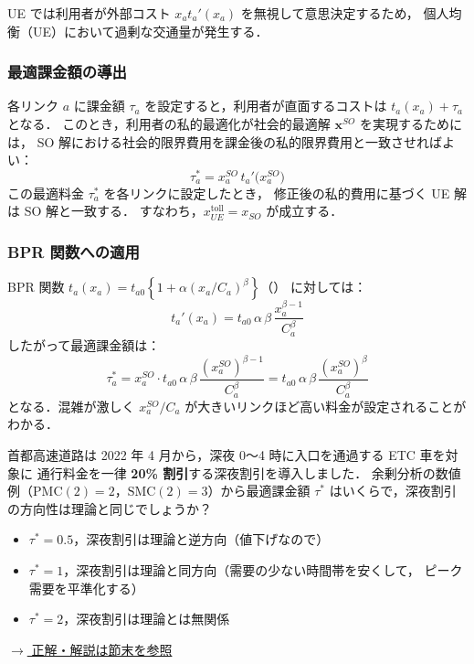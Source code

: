 UE では利用者が外部コスト $x_a t_a'(x_a)$ を無視して意思決定するため，
個人均衡（UE）において過剰な交通量が発生する．

\subsubsection*{最適課金額の導出}

各リンク $a$ に課金額 $\tau_a$ を設定すると，利用者が直面するコストは
$t_a(x_a) + \tau_a$ となる．
このとき，利用者の私的最適化が社会的最適解 $\boldsymbol{x}^{SO}$ を実現するためには，
SO 解における社会的限界費用を課金後の私的限界費用と一致させればよい\cite{Beckmann1956}：
\begin{equation}
  \tau_a^* = x_a^{SO}\, t_a'\bigl(x_a^{SO}\bigr)
  \label{eq:optimal-toll}
\end{equation}
この最適料金 $\tau_a^*$ を各リンクに設定したとき，
修正後の私的費用に基づく UE 解は SO 解と一致する．
すなわち，$x_{UE}^{\text{toll}} = x_{SO}$ が成立する．

\subsubsection*{BPR 関数への適用}

BPR 関数 $t_a(x_a) = t_{a0}\left\{1 + \alpha(x_a/C_a)^\beta\right\}$（）
に対しては：
\begin{equation}
  t_a'(x_a) = t_{a0}\,\alpha\,\beta\,\frac{x_a^{\beta-1}}{C_a^{\beta}}
  \label{eq:bpr-deriv}
\end{equation}
したがって最適課金額は：
\begin{equation}
  \tau_a^* = x_a^{SO} \cdot t_{a0}\,\alpha\,\beta\,
               \frac{(x_a^{SO})^{\beta-1}}{C_a^{\beta}}
           = t_{a0}\,\alpha\,\beta\,\frac{(x_a^{SO})^{\beta}}{C_a^{\beta}}
  \label{eq:bpr-toll}
\end{equation}
となる．混雑が激しく $x_a^{SO}/C_a$ が大きいリンクほど高い料金が設定されることがわかる．

\begin{example}[title={クイズ 8：首都高の「深夜割引」は混雑課金の考え方か？}]
首都高速道路は 2022 年 4 月から，深夜 0～4 時に入口を通過する ETC 車を対象に
通行料金を一律 \textbf{20\% 割引}する深夜割引を導入しました．
余剰分析の数値例（$\mathrm{PMC}(2)=2$，$\mathrm{SMC}(2)=3$）から最適課金額 $\tau^*$ はいくらで，深夜割引の方向性は理論と同じでしょうか？
\begin{itemize}
  \item[(ア)] $\tau^*=0.5$，深夜割引は理論と逆方向（値下げなので）
  \item[(イ)] $\tau^*=1$，深夜割引は理論と同方向（需要の少ない時間帯を安くして，
             ピーク需要を平準化する）
  \item[(ウ)] $\tau^*=2$，深夜割引は理論とは無関係
\end{itemize}
\hyperref[ans:q8]{$\rightarrow$ 正解・解説は節末を参照}
\end{example}

